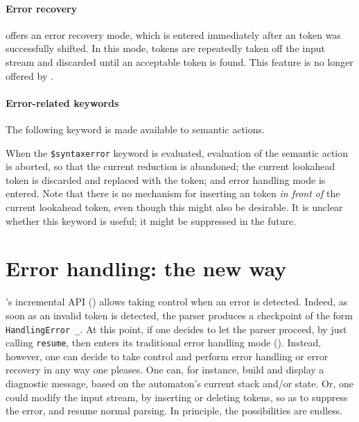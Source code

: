 \documentclass[onecolumn,11pt,nocopyrightspace,preprint]{sigplanconf}
\begin{document}
\paragraph{Error recovery}

\ocamlyacc offers an error recovery mode, which is entered immediately after
an \error token was successfully shifted. In this mode, tokens are repeatedly
taken off the input stream and discarded until an acceptable token is found.
This feature is no longer offered by \menhir.

\paragraph{Error-related keywords}

The following keyword is made available to semantic actions.

When the \verb+$syntaxerror+ keyword is evaluated, evaluation of the semantic
action is aborted, so that the current reduction is abandoned; the current
lookahead token is discarded and replaced with the \error token; and error
handling mode is entered.  Note that there is no mechanism for inserting an
\error token \emph{in front of} the current lookahead token, even though this
might also be desirable.  It is unclear whether this keyword is useful; it
might be suppressed in the future.


\section{Error handling: the new way}
\label{sec:errors:new}

\menhir's incremental API () allows taking control when
an error is detected. Indeed, as soon as an invalid token is detected, the
parser produces a checkpoint of the form \verb+HandlingError _+. At this
point, if one decides to let the parser proceed, by just
calling \verb+resume+, then \menhir enters its traditional error handling mode
(). Instead, however, one can decide to take control and
perform error handling or error recovery in any way one pleases. One can, for
instance, build and display a diagnostic message, based on the automaton's
current stack and/or state. Or, one could modify the input stream, by
inserting or deleting tokens, so as to suppress the error, and resume normal
parsing. In principle, the possibilities are endless.
\end{document}
